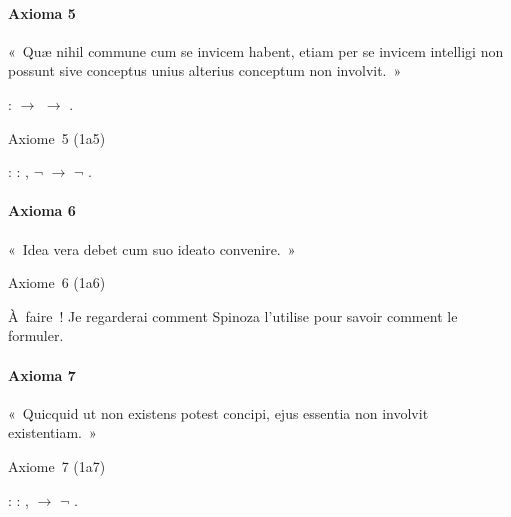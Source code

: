 \documentclass[12pt]{report}
\begin{document}
\paragraph{Axioma 5}

 « Quæ nihil commune cum se invicem habent, etiam per se invicem
  intelligi non possunt sive conceptus unius alterius conceptum non
  involvit. » \begin{coqdoccode}
\coqdocemptyline
\coqdocindent{1.00em}
 :  \ensuremath{\rightarrow}  \ensuremath{\rightarrow} .\coqdoceol
\coqdocemptyline
\end{coqdoccode}
Axiome 5 (1a5) \begin{coqdoccode}
\coqdocindent{1.00em}
 : \coqdoceol
\coqdocindent{2.00em}
\coqdockw{\ensuremath{\forall}}  : ,\coqdoceol
\coqdocindent{3.00em}
\ensuremath{\lnot}   \ensuremath{\rightarrow} \coqdoceol
\coqdocindent{3.00em}
\ensuremath{\lnot}  .\coqdoceol
\coqdocemptyline
\coqdocemptyline
\end{coqdoccode}
\paragraph{Axioma 6}

 « Idea vera debet cum suo ideato convenire. » 

 Axiome 6 (1a6) 

 À faire ! Je regarderai comment Spinoza l'utilise pour savoir
  comment le formuler. 

\paragraph{Axioma 7}

 « Quicquid ut non existens potest concipi, ejus essentia non
  involvit existentiam. » 

 Axiome 7 (1a7) \begin{coqdoccode}
\coqdocindent{1.00em}
 :\coqdoceol
\coqdocindent{2.00em}
\coqdockw{\ensuremath{\forall}} : ,\coqdoceol
\coqdocindent{3.00em}
  \ensuremath{\rightarrow} \coqdoceol
\coqdocindent{3.00em}
\ensuremath{\lnot} .\coqdoceol
\coqdocemptyline
\end{coqdoccode}
\par
\noindent\hrulefill\par
\noindent{}  
\end{document}
